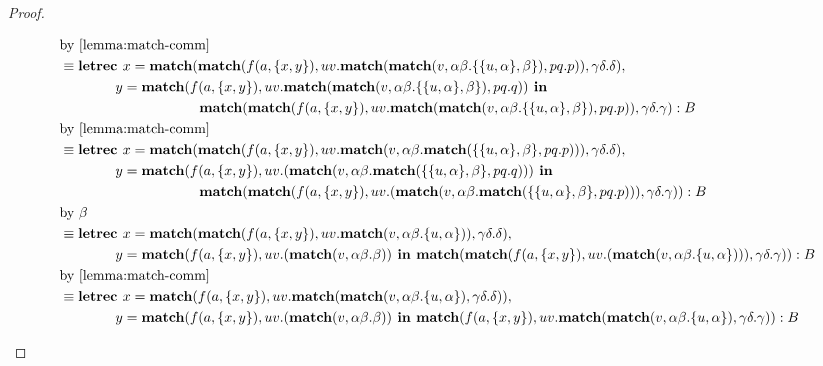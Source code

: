 \begin{example}
\begin{proof}
\begin{itemize}
\begin{align*}
&\text{by \cref{lemma:match-comm}}\\
&\equiv \textbf{letrec } x = \textbf{match}(\textbf{match}(f(a,\{x,y\}), uv.\textbf{match}(\textbf{match}(v, \alpha\beta.\{\{u,\alpha\},\beta\}), pq.p)), \gamma\delta.\delta),\\
&\hspace{4em} y = \textbf{match}(f(a,\{x,y\}), uv.\textbf{match}(\textbf{match}(v, \alpha\beta.\{\{u,\alpha\},\beta\}), pq.q)) \textbf{ in }\\
&\hspace{10em} \textbf{match}(\textbf{match}(f(a,\{x,y\}), uv.\textbf{match}(\textbf{match}(v, \alpha\beta.\{\{u,\alpha\},\beta\}), pq.p)), \gamma\delta.\gamma) : B\\
&\text{by \cref{lemma:match-comm}}\\
&\equiv \textbf{letrec } x = \textbf{match}(\textbf{match}(f(a,\{x,y\}), uv.\textbf{match}(v, \alpha\beta.\textbf{match}(\{\{u,\alpha\},\beta\}, pq.p))), \gamma\delta.\delta),\\
&\hspace{4em} y = \textbf{match}(f(a,\{x,y\}), uv.(\textbf{match}(v, \alpha\beta.\textbf{match}(\{\{u,\alpha\},\beta\}, pq.q))) \textbf{ in }\\
&\hspace{10em} \textbf{match}(\textbf{match}(f(a,\{x,y\}), uv.(\textbf{match}(v, \alpha\beta.\textbf{match}(\{\{u,\alpha\},\beta\}, pq.p))), \gamma\delta.\gamma)) : B\\
&\text{by $\beta$}\\
&\equiv \textbf{letrec } x = \textbf{match}(\textbf{match}(f(a,\{x,y\}), uv.\textbf{match}(v, \alpha\beta.\{u,\alpha\})), \gamma\delta.\delta),\\
&\hspace{4em} y = \textbf{match}(f(a,\{x,y\}), uv.(\textbf{match}(v, \alpha\beta.\beta)) \textbf{ in } \textbf{match}(\textbf{match}(f(a,\{x,y\}), uv.(\textbf{match}(v, \alpha\beta.\{u,\alpha\}))), \gamma\delta.\gamma)) : B\\
&\text{by \cref{lemma:match-comm}}\\
&\equiv \textbf{letrec } x = \textbf{match}(f(a,\{x,y\}), uv.\textbf{match}(\textbf{match}(v, \alpha\beta.\{u,\alpha\}), \gamma\delta.\delta)),\\
&\hspace{4em} y = \textbf{match}(f(a,\{x,y\}), uv.(\textbf{match}(v, \alpha\beta.\beta)) \textbf{ in } \textbf{match}(f(a,\{x,y\}), uv.\textbf{match}(\textbf{match}(v, \alpha\beta.\{u,\alpha\}), \gamma\delta.\gamma)) : B\\

\end{align*}
\end{itemize}
\end{proof}
\end{example}
